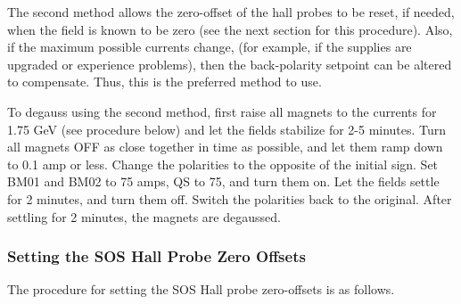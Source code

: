 The second method allows the zero-offset of the hall probes to be reset, if
needed, when the field is known to be zero (see the next section for this
procedure). Also, if the maximum possible
currents change, (for example, if the supplies are upgraded or experience
problems), then the back-polarity setpoint can be altered to compensate.
Thus, this is the preferred method to use.

To degauss using the second method, first raise all magnets to the currents for
1.75 GeV (see procedure below) and let the fields stabilize for 2-5 minutes.
Turn all magnets OFF as close together in time as possible, and let them ramp
down to 0.1 amp or less. Change the polarities to the opposite of the initial
sign. Set BM01 and BM02 to 75 amps, QS to 75, and turn them on. Let the fields
settle for 2 minutes, and turn them off. Switch the polarities back to the
original. After settling for 2 minutes, the magnets are degaussed.
\vfil\eject
%


\subsubsection{Setting the SOS Hall Probe Zero Offsets}
 
The procedure for setting the SOS Hall probe
zero-offsets is as follows.

